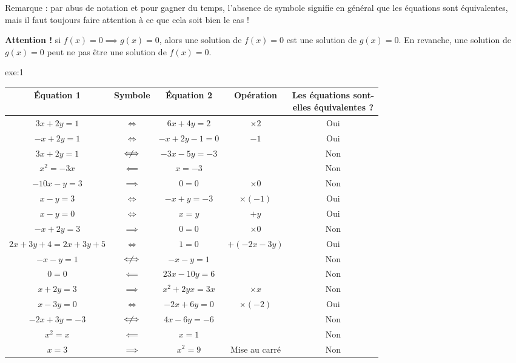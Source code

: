 {	{Remarque : par abus de notation et pour gagner du temps, l'absence de symbole signifie en général que les équations sont équivalentes, mais il faut toujours faire attention à ce que cela soit bien le cas !}
	
	\textbf{Attention !} si $f(x) = 0 \implies g(x) = 0$, alors une solution de $f(x) = 0$ est une solution de $g(x) = 0$.
	En revanche, une solution de $g(x) = 0$ peut ne pas être une solution de $f(x) = 0$.
	
}{exe:1}{
	\begin{center}
	\begin{tabular}{ccc|c|c}
		Équation 1 & Symbole & Équation 2 & Opération & \thead{Les équations sont-\\ elles équivalentes ?} \\ \hline
		$3x + 2y = 1$ & {$\iff$} & $6x  + 4y = 2$ & {$\times2$} & {Oui} \\ \hline
		$-x + 2y = 1$ & {$\iff$} & $-x + 2y - 1 = 0$ & {$-1$} & {Oui} \\ \hline
		$3x + 2y = 1$ & {$\centernot\iff$} & $-3x - 5y = -3$ & & {Non} \\ \hline
		$x^2 = -3x$ & {$\impliedby$} & $x = -3$ & & {Non} \\ \hline
		$-10x - y = 3$ & {$\implies$} & $0=0$ & {$\times0$} & {Non} \\ \hline
		$x-y= 3$ & {$\iff$} & $-x + y = -3$ & {$\times(-1)$} & {Oui} \\ \hline
		$x -y = 0$ &{$\iff$} & $x=y$ & {$+y$} & {Oui} \\ \hline
		$-x + 2y = 3$ & {$\implies$} & $0=0$ & {$\times0$} & {Non} \\ \hline
		$2x + 3y + 4 = 2x + 3y + 5$ & {$\iff$} & $1=0$ & {$+(-2x-3y)$} & {Oui} \\ \hline
		$-x - y = 1$ & {$\centernot\iff$} & $-x - y = 1$ & & {Non} \\ \hline
		$0=0$ & {$\impliedby$} & $23x - 10y = 6$ & & {Non} \\ \hline
		$x + 2y = 3$ & {$\implies$} & $x^2 + 2yx = 3x$ & {$\times x$} & {Non} \\ \hline
		$x-3y  =0$ & {$\iff$} & $-2x+6y = 0$ & {$\times(-2)$} & {Oui} \\ \hline
		$-2x + 3y = -3$ & {$\centernot\iff$} & $4x - 6y = -6$ & & {Non} \\ \hline
		$x^2 = x$ & {$\impliedby$} & $x = 1$ & & {Non} \\ \hline
		$x = 3$ & {$\implies$} & $x^2 = 9$ & {Mise au carré} & {Non} \\ \hline
	\end{tabular}
	\end{center}
}

